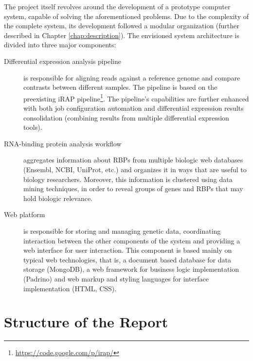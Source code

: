 
The project itself revolves around the development of a prototype computer
system, capable of solving the aforementioned problems. Due to the complexity of
the complete system, its development followed a modular organization (further
described in Chapter \ref{chap:description}). The envisioned system
architecture is divided into three major components:

\begin{description}

  \item[Differential expression analysis pipeline]
  is responsible for aligning reads against a reference genome and compare
  contrasts between different samples. The pipeline is based on the preexisting
  iRAP pipeline\footnote{\url{https://code.google.com/p/irap/}}. The pipeline's
  capabilities are further enhanced with both job configuration automation and
  differential expression results consolidation (combining results from multiple
  differential expression tools).

  \item[RNA-binding protein analysis workflow]
  aggregates information about RBPs from multiple biologic web databases
  (Ensembl, NCBI, UniProt, etc.) and organizes it in ways that are useful to
  biology researchers. Moreover, this information is clustered using data mining
  techniques, in order to reveal groups of genes and RBPs that may hold biologic
  relevance.

  \item[Web platform]
  is responsible for storing and managing genetic data, coordinating interaction
  between the other components of the system and providing a web interface for
  user interaction. This component is based mainly on typical web technologies,
  that is, a document based database for data storage (MongoDB), a web framework
  for business logic implementation (Padrino) and web markup and styling
  languages for interface implementation (HTML, CSS).

\end{description}

\section{Structure of the Report} \label{sec:outline}

